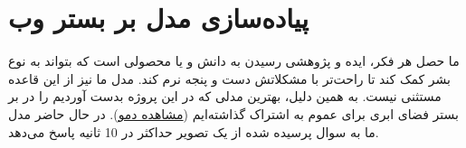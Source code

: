 \section{پیاده‌سازی مدل بر بستر وب}
{
ما حصل هر فکر، ایده و پژوهشی رسیدن به دانش و یا محصولی است که بتواند به نوع بشر کمک کند تا راحت‌تر با مشکلاتش دست و پنجه نرم کند. مدل ما نیز از این قاعده مستثنی نیست. به همین دلیل، بهترین مدلی که در این پروژه بدست آوردیم را در بر بستر فضای ابری برای عموم به اشتراک گذاشته‌ایم
(\href{http://185.206.95.210:9999/}{مشاهده دمو}).
 در حال حاضر مدل ما به سوال پرسیده شده از یک تصویر حداکثر در 10 ثانیه پاسخ می‌دهد.

}

